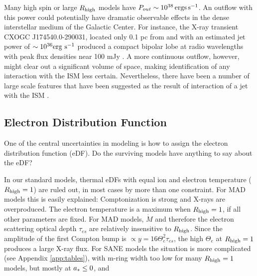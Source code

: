 Many high spin or large $R_\mathrm{high}$ models have $P_{out} \sim 10^{38} \,\mathrm{ergs\,s^{-1}}$.
An outflow with this power could potentially have dramatic observable effects in the dense interstellar medium of the Galactic Center.  For instance, the X-ray transient CXOGC J174540.0-290031, located only 0.1 pc from \sgra and with an estimated jet power of $\sim 10^{36} {\rm erg\ s^{-1}}$ produced a compact bipolar lobe at radio wavelengths with peak flux densities near 100  mJy  \citep{2005ApJ...633..218B}.  A more continuous  outflow, however, might clear out a significant volume of space, making identification of any interaction with the ISM less certain.  Nevertheless, there have been a number of large scale features that have been suggested as the result of interaction of a jet with the ISM \citep[e.g.]{2013ApJ...779..154L, 2021ApJ...922..254C}.


\subsection{Electron Distribution Function}

One of the central uncertainties in modeling \sgra is how to assign the electron distribution function (eDF).  Do the surviving models have anything to say about the eDF?

In our standard models, thermal eDFs with equal ion and electron temperature ($R_\mathrm{high} = 1$) are ruled out, in most cases by more than one constraint.  For MAD models this is easily explained: Comptonization is strong and X-rays are overproduced.  The electron temperature is a maximum when $R_\mathrm{high} = 1$, if all other parameters are fixed. For MAD models, $\dot{M}$ and therefore the electron scattering optical depth $\tau_{es}$ are relatively insensitive to $R_\mathrm{high}$.  Since the amplitude of the first Compton bump is $\propto y =  16 \Theta_e^2 \tau_{es}$, the high $\Theta_e$ at $R_\mathrm{high} = 1$ produces a large X-ray flux.  For SANE models the situation is more complicated (see Appendix \ref{app:tables}), with m-ring width too low for many $R_\mathrm{high} = 1$ models, but mostly at $a_* \le 0$, and 

